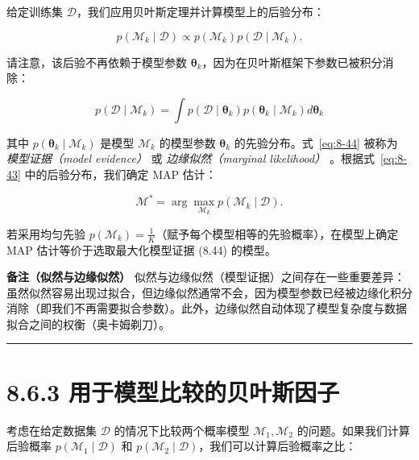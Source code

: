给定训练集 $ \mathcal{D} $，我们应用贝叶斯定理并计算模型上的后验分布：

\begin{equation}
p(\mathcal{M}_k \mid \mathcal{D}) \propto p(\mathcal{M}_k) p(\mathcal{D} \mid \mathcal{M}_k) .
\tag{8.43}\label{eq:8-43}
\end{equation}

请注意，该后验不再依赖于模型参数 $ \boldsymbol{\theta}_k $，因为在贝叶斯框架下参数已被积分消除：

\begin{equation}
p(\mathcal{D} \mid \mathcal{M}_k) = \int p(\mathcal{D} \mid \boldsymbol{\theta}_k) p(\boldsymbol{\theta}_k \mid \mathcal{M}_k) d\boldsymbol{\theta}_k
\tag{8.44}\label{eq:8-44}
\end{equation}

其中 $ p(\boldsymbol{\theta}_k \mid \mathcal{M}_k) $ 是模型 $ \mathcal{M}_k $ 的模型参数 $ \boldsymbol{\theta}_k $ 的先验分布。式~\eqref{eq:8-44} 被称为 \emph{模型证据（model evidence）} 或 \emph{边缘似然（marginal likelihood）} 。根据式~\eqref{eq:8-43} 中的后验分布，我们确定 MAP 估计：

\begin{equation}
\mathcal{M}^* = \arg\max_{\mathcal{M}_k} p(\mathcal{M}_k \mid \mathcal{D}) .
\tag{8.45}\label{eq:8-45}
\end{equation}

若采用均匀先验 $ p(\mathcal{M}_k) = \frac{1}{K} $（赋予每个模型相等的先验概率），在模型上确定 MAP 估计等价于选取最大化模型证据 (8.44) 的模型。

\begin{notebox}
\textbf{备注（似然与边缘似然）} 似然与边缘似然（模型证据）之间存在一些重要差异：虽然似然容易出现过拟合，但边缘似然通常不会，因为模型参数已经被边缘化积分消除（即我们不再需要拟合参数）。此外，边缘似然自动体现了模型复杂度与数据拟合之间的权衡（奥卡姆剃刀）。
\end{notebox}

\medskip\hrule\medskip

\section*{8.6.3 用于模型比较的贝叶斯因子}

考虑在给定数据集 $ \mathcal{D} $ 的情况下比较两个概率模型 $ \mathcal{M}_1, \mathcal{M}_2 $ 的问题。如果我们计算后验概率 $ p(\mathcal{M}_1 \mid \mathcal{D}) $ 和 $ p(\mathcal{M}_2 \mid \mathcal{D}) $，我们可以计算后验概率之比：

